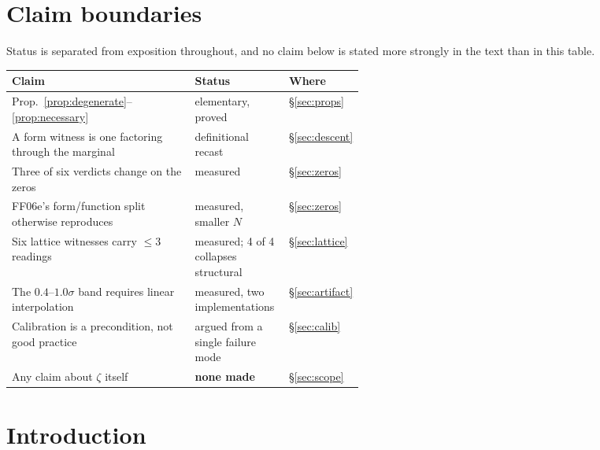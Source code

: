 \documentclass[11pt]{article}
\theoremstyle{remark}
\begin{document}
\begin{center}\small{}\end{center}

\section{Claim boundaries}\label{sec:status}

Status is separated from exposition throughout, and no claim below is stated more
strongly in the text than in this table.

\begin{center}\small
\begin{tabular}{p{0.52\linewidth}ll}
\toprule
Claim & Status & Where \\
\midrule
Prop.~\ref{prop:degenerate}--\ref{prop:necessary} & elementary, proved & \S\ref{sec:props} \\
A form witness is one factoring through the marginal & definitional recast & \S\ref{sec:descent} \\
Three of six verdicts change on the zeros & measured & \S\ref{sec:zeros} \\
FF06e's form/function split otherwise reproduces & measured, smaller $N$ & \S\ref{sec:zeros} \\
Six lattice witnesses carry $\le 3$ readings & measured; 4 of 4 collapses structural & \S\ref{sec:lattice} \\
The $0.4$--$1.0\sigma$ band requires linear interpolation & measured, two implementations & \S\ref{sec:artifact} \\
Calibration is a precondition, not good practice & argued from a single failure mode & \S\ref{sec:calib} \\
Any claim about $\zeta$ itself & \textbf{none made} & \S\ref{sec:scope} \\
\bottomrule
\end{tabular}
\end{center}

\section{Introduction}
\end{document}
